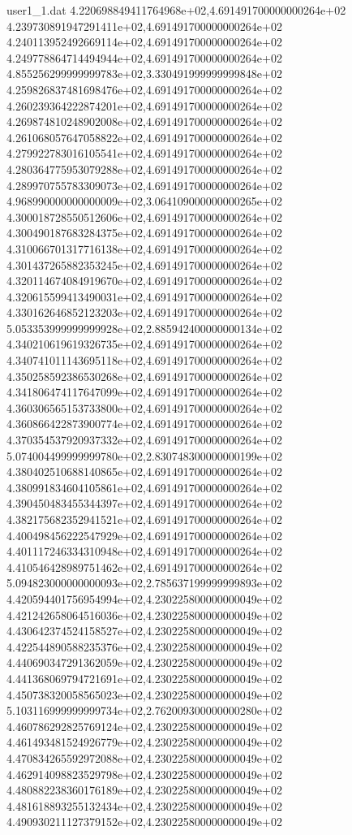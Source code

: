 \begin{filecontents}{user1_1.dat}
4.220698849411764968e+02,4.691491700000000264e+02
4.239730891947291411e+02,4.691491700000000264e+02
4.240113952492669114e+02,4.691491700000000264e+02
4.249778864714494944e+02,4.691491700000000264e+02
4.855256299999999783e+02,3.330491999999999848e+02
4.259826837481698476e+02,4.691491700000000264e+02
4.260239364222874201e+02,4.691491700000000264e+02
4.269874810248902008e+02,4.691491700000000264e+02
4.261068057647058822e+02,4.691491700000000264e+02
4.279922783016105541e+02,4.691491700000000264e+02
4.280364775953079288e+02,4.691491700000000264e+02
4.289970755783309073e+02,4.691491700000000264e+02
4.968990000000000009e+02,3.064109000000000265e+02
4.300018728550512606e+02,4.691491700000000264e+02
4.300490187683284375e+02,4.691491700000000264e+02
4.310066701317716138e+02,4.691491700000000264e+02
4.301437265882353245e+02,4.691491700000000264e+02
4.320114674084919670e+02,4.691491700000000264e+02
4.320615599413490031e+02,4.691491700000000264e+02
4.330162646852123203e+02,4.691491700000000264e+02
5.053353999999999928e+02,2.885942400000000134e+02
4.340210619619326735e+02,4.691491700000000264e+02
4.340741011143695118e+02,4.691491700000000264e+02
4.350258592386530268e+02,4.691491700000000264e+02
4.341806474117647099e+02,4.691491700000000264e+02
4.360306565153733800e+02,4.691491700000000264e+02
4.360866422873900774e+02,4.691491700000000264e+02
4.370354537920937332e+02,4.691491700000000264e+02
5.074004499999999780e+02,2.830748300000000199e+02
4.380402510688140865e+02,4.691491700000000264e+02
4.380991834604105861e+02,4.691491700000000264e+02
4.390450483455344397e+02,4.691491700000000264e+02
4.382175682352941521e+02,4.691491700000000264e+02
4.400498456222547929e+02,4.691491700000000264e+02
4.401117246334310948e+02,4.691491700000000264e+02
4.410546428989751462e+02,4.691491700000000264e+02
5.094823000000000093e+02,2.785637199999999893e+02
4.420594401756954994e+02,4.230225800000000049e+02
4.421242658064516036e+02,4.230225800000000049e+02
4.430642374524158527e+02,4.230225800000000049e+02
4.422544890588235376e+02,4.230225800000000049e+02
4.440690347291362059e+02,4.230225800000000049e+02
4.441368069794721691e+02,4.230225800000000049e+02
4.450738320058565023e+02,4.230225800000000049e+02
5.103116999999999734e+02,2.762009300000000280e+02
4.460786292825769124e+02,4.230225800000000049e+02
4.461493481524926779e+02,4.230225800000000049e+02
4.470834265592972088e+02,4.230225800000000049e+02
4.462914098823529798e+02,4.230225800000000049e+02
4.480882238360176189e+02,4.230225800000000049e+02
4.481618893255132434e+02,4.230225800000000049e+02
4.490930211127379152e+02,4.230225800000000049e+02

\end{filecontents}
